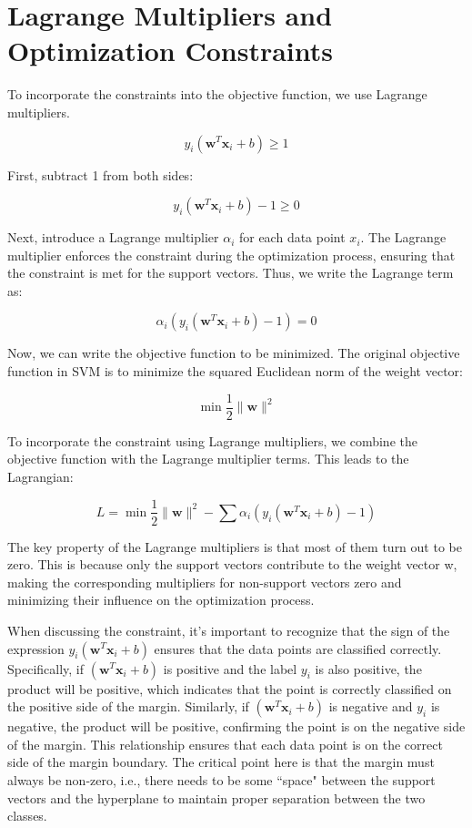 \section{Lagrange Multipliers and Optimization Constraints}

To incorporate the constraints into the objective function, we use Lagrange multipliers.

\[
y_i (\mathbf{w}^T \mathbf{x}_i + b) \geq 1
\]

First, subtract 1 from both sides:

\[
y_i (\mathbf{w}^T \mathbf{x}_i + b) - 1 \geq 0
\]

Next, introduce a Lagrange multiplier \( \alpha_i \) for each data point \( x_i \). The Lagrange multiplier enforces the constraint during the optimization process, 
ensuring that the constraint is met for the support vectors. Thus, we write the Lagrange term as:

\[
\alpha_i \left( y_i (\mathbf{w}^T \mathbf{x}_i + b) - 1 \right) = 0
\]

Now, we can write the objective function to be minimized. The original objective function in SVM is to minimize the squared Euclidean norm of the weight vector:

\[
\min \frac{1}{2} \| \mathbf{w} \|^2
\]

To incorporate the constraint using Lagrange multipliers, we combine the objective function with the Lagrange multiplier terms. This leads to the Lagrangian:

\[
L = \min \frac{1}{2} \| \mathbf{w} \|^2 - \sum \alpha_i \left( y_i (\mathbf{w}^T \mathbf{x}_i + b) - 1 \right)
\]

The key property of the Lagrange multipliers is that most of them turn out to be zero. This is because only the support vectors contribute to the weight vector w, 
making the corresponding multipliers for non-support vectors zero and minimizing their influence on the optimization process.

When discussing the constraint, it's important to recognize that the sign of the expression \( y_i (\mathbf{w}^T \mathbf{x}_i + b) \) ensures that the data points are classified correctly. 
Specifically, if \( (\mathbf{w}^T \mathbf{x}_i + b) \) is positive and the label \( y_i \) is also positive, the product will be positive, which indicates that the point is correctly classified on the positive side of the margin. Similarly, if \( (\mathbf{w}^T \mathbf{x}_i + b) \) is negative and \( y_i \) is negative, the product will be positive, confirming the point is on the negative side of the margin. This relationship ensures that each data point is on the correct side of the margin boundary. The critical point here is that the margin must always be non-zero, i.e., there needs to be some ``space" between the support vectors and the hyperplane to maintain proper separation between the two classes.


